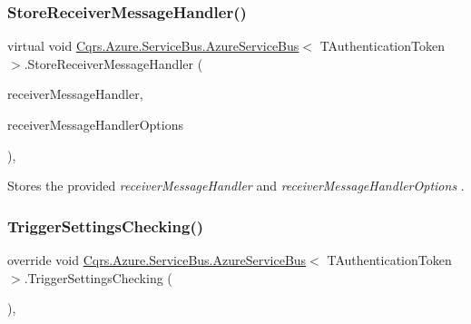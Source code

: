 \subsubsection{\texorpdfstring{Store\+Receiver\+Message\+Handler()}{StoreReceiverMessageHandler()}}
{\footnotesize\ttfamily virtual void \hyperlink{classCqrs_1_1Azure_1_1ServiceBus_1_1AzureServiceBus}{Cqrs.\+Azure.\+Service\+Bus.\+Azure\+Service\+Bus}$<$ T\+Authentication\+Token $>$.Store\+Receiver\+Message\+Handler (\begin{DoxyParamCaption}\item[{Action$<$ Brokered\+Message $>$}]{receiver\+Message\+Handler,  }\item[{On\+Message\+Options}]{receiver\+Message\+Handler\+Options }\end{DoxyParamCaption})\hspace{0.3cm}{\ttfamily [protected]}, {\ttfamily [virtual]}}



Stores the provided {\itshape receiver\+Message\+Handler}  and {\itshape receiver\+Message\+Handler\+Options} . 

\mbox{\label{classCqrs_1_1Azure_1_1ServiceBus_1_1AzureServiceBus_ae4b736019e332a81eb08d3696f8b6e7e_ae4b736019e332a81eb08d3696f8b6e7e}} 
\subsubsection{\texorpdfstring{Trigger\+Settings\+Checking()}{TriggerSettingsChecking()}\hspace{0.1cm}{\footnotesize\ttfamily [1/2]}}
{\footnotesize\ttfamily override void \hyperlink{classCqrs_1_1Azure_1_1ServiceBus_1_1AzureServiceBus}{Cqrs.\+Azure.\+Service\+Bus.\+Azure\+Service\+Bus}$<$ T\+Authentication\+Token $>$.Trigger\+Settings\+Checking (\begin{DoxyParamCaption}{ }\end{DoxyParamCaption})\hspace{0.3cm}{\ttfamily [protected]}, {\ttfamily [virtual]}}



